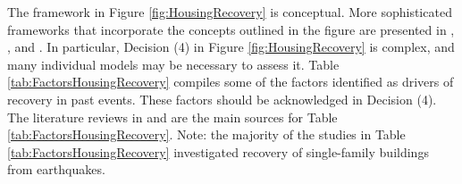 The framework in Figure \ref{fig:HousingRecovery} is conceptual. More sophisticated frameworks that incorporate the concepts outlined in the figure are presented in  \citet{Sutley2017a}, \citet{Burton2018}, and \citet{costa2020housing}. In particular, Decision (4) in Figure \ref{fig:HousingRecovery} is complex, and many individual models may be necessary to assess it. Table \ref{tab:FactorsHousingRecovery} compiles some of the factors identified as drivers of recovery in past events. These factors should be acknowledged in Decision (4). The literature reviews in \citet{Costa2019thesis} and \citet{moradi2020recovus} are the main sources for Table \ref{tab:FactorsHousingRecovery}. Note: the majority of the studies in Table \ref{tab:FactorsHousingRecovery} investigated recovery of single-family buildings from earthquakes. \ 


